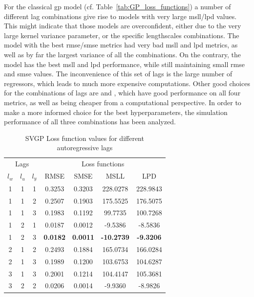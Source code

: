 For the classical \acrshort{gp} model (cf. Table~\ref{tab:GP_loss_functions}) a
number of different lag combinations give rise to models with very large
\acrshort{msll}/\acrshort{lpd} values. This might indicate that those models are
overconfident, either due to the very large kernel variance parameter, or the
specific lengthscales combinations. The model with the best
\acrshort{rmse}/\acrshort{smse} metrics  had very bad
\acrshort{msll} and \acrshort{lpd} metrics, as well as by far the largest
variance of all the combinations. On the contrary, the  model has
the best \acrshort{msll} and \acrshort{lpd} performance, while still maintaining
small \acrshort{rmse} and \acrshort{smse} values. The inconvenience of this set
of lags is the large number of regressors, which leads to much more expensive
computations. Other good choices for the combinations of lags are
 and , which have good performance on all four
metrics, as well as being cheaper from a computational perspective. In order to
make a more informed choice for the best hyperparameters, the simulation
performance of all three combinations has been analyzed.

\begin{table}[ht]
\centering
    \begin{tabular}{||c c c|c c c c||}
        \hline
        \multicolumn{3}{||c|}{Lags} & \multicolumn{4}{c||}{Loss functions}\\
        $l_w$ & $l_u$ & $l_y$ & RMSE & SMSE & MSLL & LPD\\
        \hline \hline
        1 & 1 & 1 & 0.3253 & 0.3203 & 228.0278 & 228.9843 \\
        1 & 1 & 2 & 0.2507 & 0.1903 & 175.5525 & 176.5075 \\
        1 & 1 & 3 & 0.1983 & 0.1192 & 99.7735 & 100.7268 \\
        1 & 2 & 1 & 0.0187 & 0.0012 & -9.5386 & -8.5836 \\
        1 & 2 & 3 & \textbf{0.0182} & \textbf{0.0011} & \textbf{-10.2739} &
        \textbf{-9.3206} \\
        2 & 1 & 2 & 0.2493 & 0.1884 & 165.0734 & 166.0284 \\
        2 & 1 & 3 & 0.1989 & 0.1200 & 103.6753 & 104.6287 \\
        3 & 1 & 3 & 0.2001 & 0.1214 & 104.4147 & 105.3681 \\
        3 & 2 & 2 & 0.0206 & 0.0014 & -9.9360 & -8.9826 \\
        \hline
    \end{tabular}
\caption{SVGP Loss function values for different autoregressive lags}
\label{tab:SVGP_loss_functions}
\end{table}

